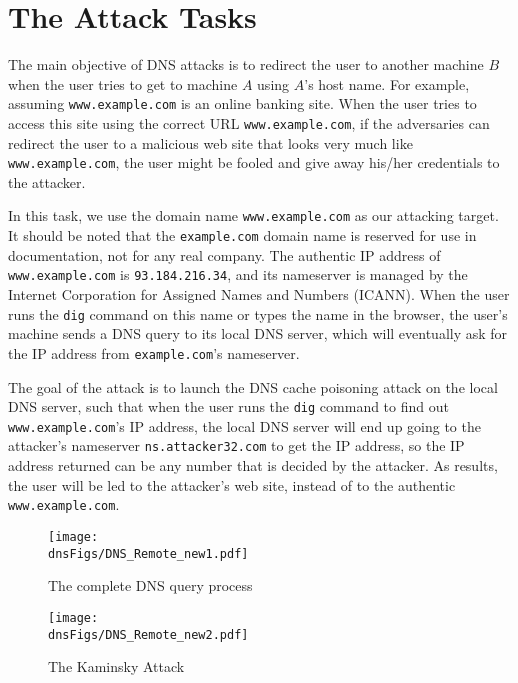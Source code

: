 \section{The Attack Tasks}


The main objective of DNS attacks is to redirect the user
to another machine $B$ when the user tries to get to machine $A$ using
$A$'s host name. For example, assuming {\tt www.example.com} is an online banking 
site.  When the user tries to access this site using the
correct URL {\tt www.example.com}, if the adversaries can redirect the user 
to a malicious web site that looks very much like 
{\tt www.example.com}, the user might be fooled and give away 
his/her credentials to the attacker. 


In this task, we use the domain name {\tt www.example.com}
as our attacking target. It should be noted that the {\tt example.com} 
domain name is reserved for use in documentation, not for 
any real company. The authentic IP address of {\tt www.example.com} is 
{\tt 93.184.216.34}, and its nameserver is managed by
the Internet Corporation for Assigned Names and Numbers (ICANN).
When the user runs the {\tt dig} command 
on this name or types the name in the browser, 
the user's machine sends a DNS query to its local DNS 
server, which will eventually ask for the IP address 
from {\tt example.com}'s nameserver. 


The goal of the attack is to launch the DNS cache poisoning attack
on the local DNS server, such that 
when the user runs the {\tt dig} command to find out {\tt
www.example.com}'s IP address, the local DNS server will end
up going to the attacker's nameserver {\tt ns.attacker32.com} 
to get the IP address, so the IP address returned can be 
any number that is decided by the attacker. As results, the 
user will be led to the attacker's web site,
instead of to the authentic {\tt www.example.com}.




\begin{figure}[htb]
\centering
\texttt{[image: \\dnsFigs/DNS\_Remote\_new1.pdf]}
\caption{The complete DNS query process} 
\label{fig:flow_diagram1}
\end{figure}


\begin{figure}[htb]
\centering
\texttt{[image: \\dnsFigs/DNS\_Remote\_new2.pdf]}
\caption{The Kaminsky Attack}
\label{fig:flow_diagram2}
\end{figure}



